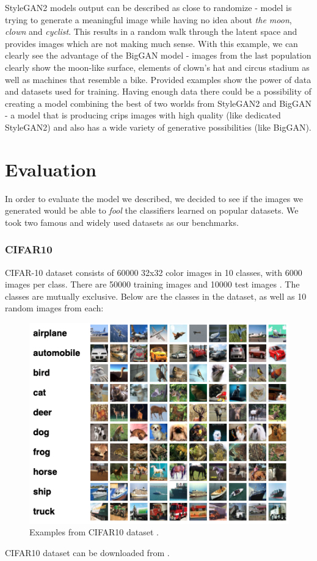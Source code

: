 \documentclass[11pt,a4paper,openany]{book}
\begin{document}
\noindent StyleGAN2 models output can be described as close to randomize - model is trying to generate a meaningful image while having no idea about \textit{the moon}, \textit{clown} and \textit{cyclist}. This results in a random walk through the latent space and provides images which are not making much sense. With this example, we can clearly see the advantage of the BigGAN model - images from the last population clearly show the moon-like surface, elements of clown's hat and circus stadium as well as machines that resemble a bike.
\noindent Provided examples show the power of data and datasets used for training. Having enough data there could be a possibility of creating a model combining the best of two worlds from StyleGAN2 and BigGAN - a model that is producing crips images with high quality (like dedicated StyleGAN2) and also has a wide variety of generative possibilities (like BigGAN).

\newpage

\chapter{Evaluation}

\noindent In order to evaluate the model we described, we decided to see if the images we generated would be able to \textit{fool} the classifiers learned on popular datasets.
We took two famous and widely used datasets as our benchmarks.
\subsection*{CIFAR10}
\noindent CIFAR-10 dataset consists of 60000 32x32 color images in 10 classes, with 6000 images per class. There are 50000 training images and 10000 test images \cite{cifar10_data}. The classes are mutually exclusive. Below are the classes in the dataset, as well as 10 random images from each:
\begin{figure}[H]
    \centering
    \includegraphics[scale=0.6]{figs/cifar10_dataset.png}
    \caption{Examples from CIFAR10 dataset \cite{cifar10_data}.}
\end{figure}
\noindent CIFAR10 dataset can be downloaded from \cite{cifar10_data}.
\end{document}
